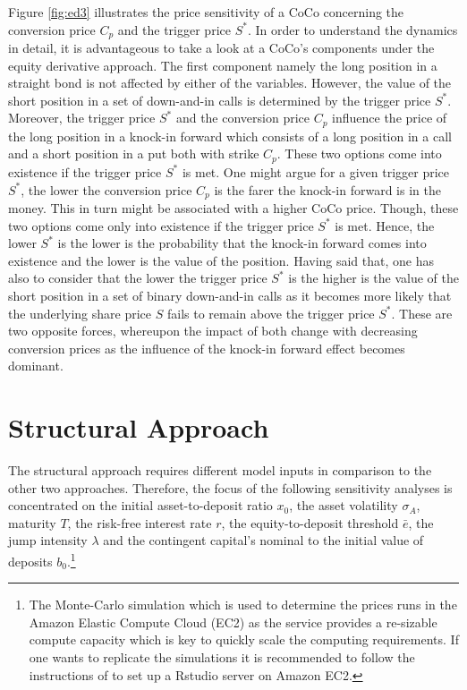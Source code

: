 Figure \ref{fig:ed3} illustrates the price sensitivity of a CoCo concerning the conversion price $C_p$ and the trigger price $S^*$. In order to understand the dynamics in detail, it is advantageous to take a look at a CoCo's components under the equity derivative approach. The first component namely the long position in a straight bond is not affected by either of the variables. However, the value of the short position in a set of down-and-in calls is determined by the trigger price $S^*$. Moreover, the trigger price $S^*$ and the conversion price $C_p$ influence the price of the long position in a knock-in forward which consists of a long position in a call and a short position in a put both with strike $C_p$. These two options come into existence if the trigger price $S^*$ is met. One might argue for a given trigger price $S^*$, the lower the conversion price $C_p$ is the farer the knock-in forward is in the money. This in turn might be associated with a higher CoCo price. Though, these two options come only into existence if the trigger price $S^*$ is met. Hence, the lower $S^*$ is the lower is the probability that the knock-in forward comes into existence and the lower is the value of the position. Having said that, one has also to consider that the lower the trigger price $S^*$ is the higher is the value of the short position in a set of binary down-and-in calls as it becomes more likely that the underlying share price $S$ fails to remain above the trigger price $S^*$. These are two opposite forces, whereupon the impact of both change with decreasing conversion prices as the influence of the knock-in forward effect becomes dominant. 

\section{Structural Approach}\label{sensistructural}
The structural approach requires different model inputs in comparison to the other two approaches. Therefore, the focus of the following sensitivity analyses is concentrated on the initial asset-to-deposit ratio $x_0$, the asset volatility $\sigma_A$, maturity $T$, the risk-free interest rate $r$, the equity-to-deposit threshold $\bar{e}$, the jump intensity $\lambda$ and the contingent capital's nominal to the initial value of deposits $b_0$.\footnote{The Monte-Carlo simulation which is used to determine the prices runs in the Amazon Elastic Compute Cloud (EC2) as the service provides a re-sizable compute capacity which is key to quickly scale the computing requirements. If one wants to replicate the simulations it is recommended to follow the instructions of \citet{amazonrstudio} to set up a Rstudio server on Amazon EC2.} 

